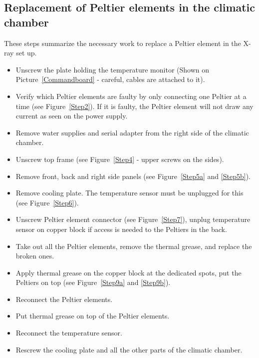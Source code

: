 \documentclass[a4paper,12pt,twoside]{article}
\begin{document}
\begin{appendices}

\section{Replacement of Peltier elements in the climatic chamber} \label{Peltier}

These steps summarize the necessary work to replace a Peltier element in the X-ray set up.
\begin{itemize}
\item Unscrew the plate holding the temperature monitor (Shown on Picture~\ref{Commandboard} - careful, cables are attached to it).
\item Verify which Peltier elements are faulty by only connecting one Peltier at a time (see Figure~\ref{Step2}). If it is faulty, the Peltier element will not draw any current as seen on the power supply.
\item Remove water supplies and serial adapter from the right side of the climatic chamber.
\item Unscrew top frame (see Figure~\ref{Step4} - upper screws on the sides).
\item Remove front, back and right side panels (see Figure~\ref{Step5a} and \ref{Step5b}).
\item Remove cooling plate. The temperature sensor must be unplugged for this (see Figure~\ref{Step6}).
\item Unscrew Peltier element connector (see Figure~\ref{Step7}), unplug temperature sensor on copper block if access is needed to the Peltiers in the back.
\item Take out all the Peltier elements, remove the thermal grease, and replace the broken ones.
\item Apply thermal grease on the copper block at the dedicated spots, put the Peltiers on top (see Figure~\ref{Step9a} and \ref{Step9b}).
\item Reconnect the Peltier elements.
\item Put thermal grease on top of the Peltier elements.
\item Reconnect the temperature sensor.
\item Rescrew the cooling plate and all the other parts of the climatic chamber.


\end{itemize}
\end{appendices}
\end{document}
